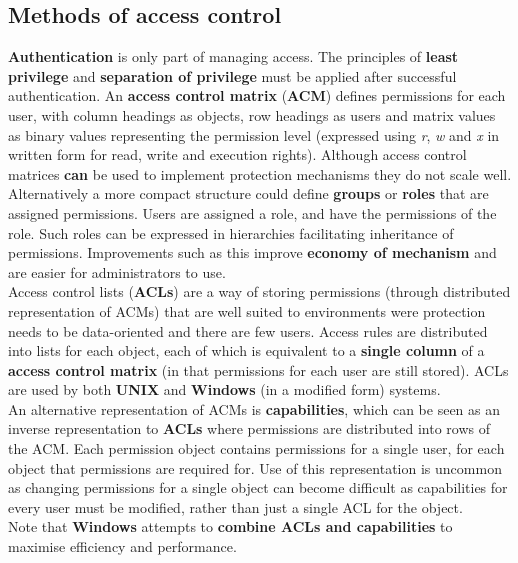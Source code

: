 \documentclass{article}
\newcommand{\np}{\vspace{8pt} \\}
\begin{document}
\subsection{Methods of access control}
\textbf{Authentication} is only part of managing access. The principles of \textbf{least privilege} and \textbf{separation of privilege} must be applied after successful authentication. An \textbf{access control matrix} (\textbf{ACM}) defines permissions for each user, with column headings as objects, row headings as users and matrix values as binary values representing the permission level (expressed using \textit{r}, \textit{w} and \textit{x} in written form for read, write and execution rights). Although access control matrices \textbf{can} be used to implement protection mechanisms they do not scale well. \np
Alternatively a more compact structure could define \textbf{groups} or \textbf{roles} that are assigned permissions. Users are assigned  a role, and have the permissions of the role. Such roles can be expressed in hierarchies facilitating inheritance of permissions. Improvements such as this improve \textbf{economy of mechanism} and are easier for administrators to use. \np
Access control lists (\textbf{ACLs}) are a way of storing permissions (through distributed representation of ACMs) that are well suited to environments were protection needs to be data-oriented and there are few users. Access rules are distributed into lists for each object, each of which is equivalent to a \textbf{single column} of a \textbf{access control matrix} (in that permissions for each user are still stored). ACLs are used by both \textbf{UNIX} and \textbf{Windows} (in a modified form) systems. \np
An alternative representation of ACMs is \textbf{capabilities}, which can be seen as an inverse representation to \textbf{ACLs} where permissions are distributed into rows of the ACM. Each permission object contains permissions for a single user, for each object that permissions are required for. Use of this representation is uncommon as changing permissions for a single object can become difficult as capabilities for every user must be modified, rather than just a single ACL for the object. \np
Note that \textbf{Windows} attempts to \textbf{combine ACLs and capabilities} to maximise efficiency and performance.
\end{document}
